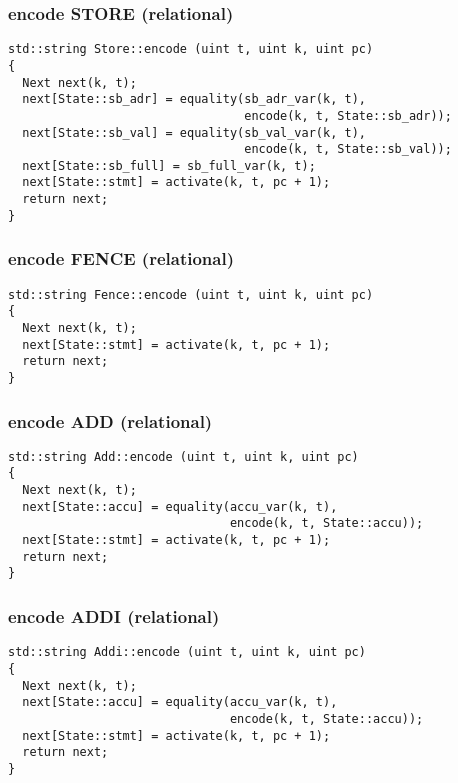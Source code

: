 \subsubsection{encode STORE (relational)}

\begin{lstlisting}[style=c++]
std::string Store::encode (uint t, uint k, uint pc)
{
  Next next(k, t);
  next[State::sb_adr] = equality(sb_adr_var(k, t),
                                 encode(k, t, State::sb_adr));
  next[State::sb_val] = equality(sb_val_var(k, t),
                                 encode(k, t, State::sb_val));
  next[State::sb_full] = sb_full_var(k, t);
  next[State::stmt] = activate(k, t, pc + 1);
  return next;
}
\end{lstlisting}

\subsubsection{encode FENCE (relational)}

\begin{lstlisting}[style=c++]
std::string Fence::encode (uint t, uint k, uint pc)
{
  Next next(k, t);
  next[State::stmt] = activate(k, t, pc + 1);
  return next;
}
\end{lstlisting}

\subsubsection{encode ADD (relational)}

\begin{lstlisting}[style=c++]
std::string Add::encode (uint t, uint k, uint pc)
{
  Next next(k, t);
  next[State::accu] = equality(accu_var(k, t),
                               encode(k, t, State::accu));
  next[State::stmt] = activate(k, t, pc + 1);
  return next;
}
\end{lstlisting}

\subsubsection{encode ADDI (relational)}

\begin{lstlisting}[style=c++]
std::string Addi::encode (uint t, uint k, uint pc)
{
  Next next(k, t);
  next[State::accu] = equality(accu_var(k, t),
                               encode(k, t, State::accu));
  next[State::stmt] = activate(k, t, pc + 1);
  return next;
}
\end{lstlisting}

